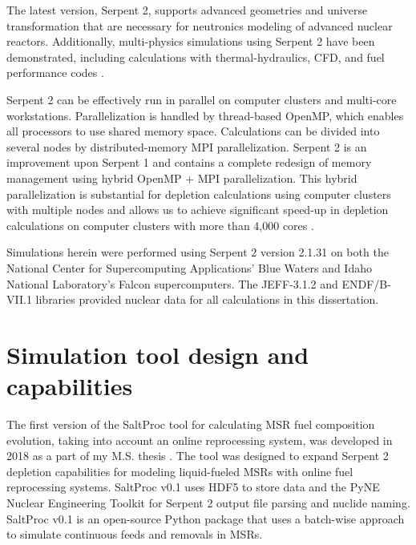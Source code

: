 The latest version, Serpent 2, supports advanced geometries and universe 
transformation that are necessary for neutronics modeling of advanced nuclear 
reactors. Additionally, multi-physics simulations using Serpent 2 have been 
demonstrated, including  calculations with thermal-hydraulics, \gls{CFD}, and 
fuel performance codes \cite{leppanen_numerical_2015}. 

Serpent 2 can be effectively run in parallel on computer clusters and 
multi-core workstations. Parallelization is handled by thread-based OpenMP, 
which enables all processors to use shared memory space. Calculations can be 
divided into several nodes by distributed-memory \gls{MPI} parallelization. 
Serpent 2  is an improvement upon Serpent 1 and contains a complete redesign 
of memory management using hybrid OpenMP \cite{dagum_openmp_1998} + \gls{MPI} 
parallelization.  This hybrid parallelization is substantial for depletion 
calculations using computer clusters with multiple nodes and allows us to 
achieve significant speed-up in depletion calculations on computer clusters 
with more than 4,000 cores \cite{leppanen_serpent_2014}. 

Simulations herein were performed using Serpent 2 version 2.1.31 on both the 
National Center for Supercomputing Applications' Blue Waters and Idaho 
National Laboratory's Falcon supercomputers. The JEFF-3.1.2 
\cite{oecd/nea_jeff-3.1.2_2014} and ENDF/B-VII.1 
\cite{chadwick_endf/b-vii.1_2011} libraries provided nuclear data 
for all calculations in this dissertation. 

\section{Simulation tool design and capabilities}\label{sec:tool_design}
The first version of the SaltProc tool for calculating \gls{MSR} fuel 
composition evolution, taking into account an online reprocessing system,  
was developed in 2018 as a part of my M.S. thesis  
\cite{rykhlevskii_arfc/saltproc_2018, rykhlevskii_advanced_2018}. The tool was 
designed to expand Serpent 2 depletion capabilities for modeling liquid-fueled 
\glspl{MSR} with online fuel reprocessing systems. SaltProc v0.1 uses HDF5 
\cite{the_hdf_group_hierarchical_1997} to store data and the PyNE Nuclear 
Engineering Toolkit \cite{scopatz_pyne_2012} for Serpent 2 output file parsing 
and nuclide naming. SaltProc v0.1 is an open-source Python package that uses a 
batch-wise approach to simulate continuous feeds and removals in \glspl{MSR}. 


